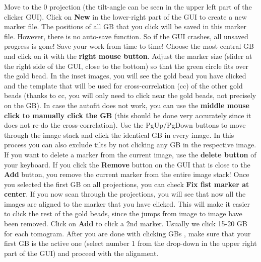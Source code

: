 \documentclass[12pt,a4paper]{scrartcl}
\begin{document}
{Move to the 0  projection (the tilt-angle can be seen in the upper left part of the clicker GUI). Click on \textbf{New} in the lower-right part of the GUI to create a new marker file. The positions of all GB that you click will be saved in this marker file. However, there is no auto-save function. So if the GUI crashes, all unsaved progress is gone! Save your work from time to time! Choose the most central GB and click on it with the \textbf{right mouse button}. Adjust the marker size (slider at the right side of the GUI, close to the bottom) so that the green circle fits over the gold bead. In the inset images, you will see the gold bead you have clicked and the template that will be used for cross-correlation (cc) of the other gold beads (thanks to cc, you will only need to click near the gold beads, not precisely on the GB). In case the autofit does not work, you can use the \textbf{middle mouse click to manually click the GB} (this should be done very accurately since it does not re-do the cross-correlation). Use the PgUp/PgDown buttons to move through the image stack and click the identical GB in every image. In this process you can also exclude tilts by not clicking any GB in the respective image.  If you want to delete a marker from the current image, use the \textbf{delete button} of your keyboard. If you click the \textbf{Remove} button on the GUI that is close to the \textbf{Add} button, you remove the current marker from the entire image stack!
Once you selected the first GB on all projections, you can check \textbf{Fix fist marker at center}. If you now scan through the projections, you will see that now all the images are aligned to the marker that you have clicked. This will make it easier to click the rest of the gold beads, since the jumps from image to image have been removed. Click on \textbf{Add} to click a 2nd marker. Usually we click 15-20 GB for each tomogram. 
After you are done with clicking GBs , make sure that your first GB is the active one (select number 1 from the drop-down in the upper right part of the GUI) and proceed with the alignment. 

}
\end{document}
